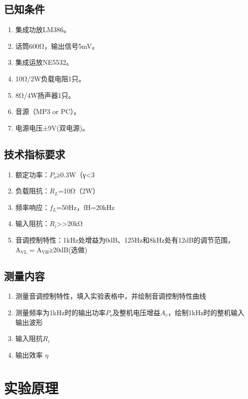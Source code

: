 \documentclass[a4paper]{article}
\theoremstyle{definition}
\theoremstyle{plain}
\theoremstyle{remark}
\begin{document}
\subsection{已知条件}
\begin{enumerate}
	\item	集成功放LM386。
	\item	话筒600Ω，输出信号5mV。
	\item	集成运放NE5532。
	\item	10Ω/2W负载电阻1只。
	\item	8Ω/4W扬声器1只。
	\item	音源（MP3 or PC）。
	\item	电源电压±9V(双电源)。
\end{enumerate}

\subsection{技术指标要求}
\begin{enumerate}
	\item	额定功率：$P_o$≥0.3W（γ<3%
	\item	负载阻抗：$R_L$=10Ω（2W）
	\item	频率响应：$f_L$=50Hz，fH=20kHz
	\item	输入阻抗：$R_i$>>20kΩ
	\item	音调控制特性：1kHz处增益为0dB、125Hz和8kHz处有12dB的调节范围，$\mathrm{A_{VL}=A_{VH}}$≥20dB(选做)
\end{enumerate}

\subsection{测量内容}
\begin{enumerate}
	\item   测量音调控制特性，填入实验表格中，并绘制音调控制特性曲线
	\item	测量频率为1kHz时的输出功率$P_o$及整机电压增益$A_v$，绘制1kHz时的整机输入输出波形
	\item	输入阻抗$R_i$
	\item	输出效率 $\eta$
\end{enumerate}

\section{实验原理}
\end{document}
